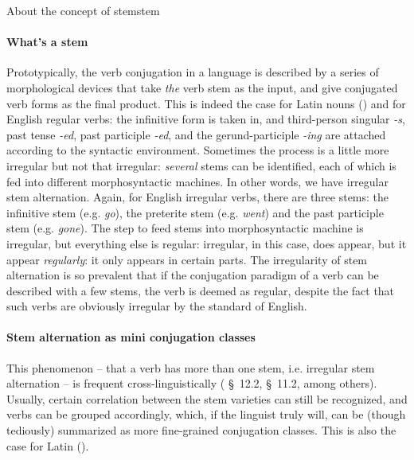 \documentclass[a4paper, oneside]{report}
\newcommand*{\citesec}[1]{\S~{#1}}
\newcommand{\corpus}[1]{\emph{#1}}
\begin{document}
\begin{theorybox}{About the concept of stem}{stem}
    \paragraph*{What's a stem} Prototypically, the verb conjugation in a language is described by 
    a series of morphological devices that take \emph{the} verb stem as the input,
    and give conjugated verb forms as the final product.
    This is indeed the case for Latin nouns ()
    and for English regular verbs:
    the infinitive form is taken in,
    and third-person singular \corpus{-s}, past tense \corpus{-ed}, 
    past participle \corpus{-ed}, and the gerund-participle \corpus{-ing}
    are attached according to the syntactic environment.
    Sometimes the process is a little more irregular but not that irregular:
    \emph{several} stems can be identified, each of which is fed into different morphosyntactic machines.
    In other words, we have irregular stem alternation.
    Again, for English irregular verbs,
    there are three stems: the infinitive stem (e.g. \corpus{go}), 
    the preterite stem (e.g. \corpus{went})
    and the past participle stem (e.g. \corpus{gone}).
    The step to feed stems into morphosyntactic machine is irregular,
    but everything else is regular:
    irregular, in this case, does appear, but it appear \emph{regularly}:
    it only appears in certain parts.
    The irregularity of stem alternation is so prevalent
    that if the conjugation paradigm of a verb can be described with a few stems,
    the verb is deemed as regular, 
    despite the fact that such verbs are obviously irregular by the standard of English.

    \paragraph*{Stem alternation as mini conjugation classes} 
    This phenomenon -- that a verb has more than one stem, i.e. irregular stem alternation
    -- is frequent cross-linguistically
    (\citealt{jacques2021grammar} \citesec{12.2}, \citealt{forker2020grammar} \citesec{11.2}, among others).
    Usually, certain correlation between the stem varieties can still be recognized,
    and verbs can be grouped accordingly,
    which, if the linguist truly will, 
    can be (though tediously) summarized as more fine-grained conjugation classes.
    This is also the case for Latin ().


\end{theorybox}
\end{document}
